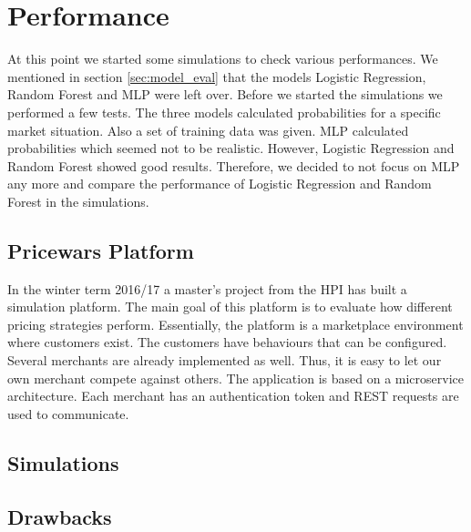 \section{Performance}
    At this point we started some simulations to check various performances. We mentioned in section \ref{sec:model_eval} that the models Logistic Regression, Random Forest and MLP were left over. Before we started the simulations we performed a few tests. The three models calculated probabilities for a specific market situation. Also a set of training data was given. MLP calculated probabilities which seemed not to be realistic. However, Logistic Regression and Random Forest showed good results. Therefore, we decided to not focus on MLP any more and compare the performance of Logistic Regression and Random Forest in the simulations.

\subsection{Pricewars Platform}
    In the winter term 2016/17 a master's project from the HPI has built a simulation platform. The main goal of this platform is to evaluate how different pricing strategies perform. Essentially, the platform is a marketplace environment where customers exist. The customers have behaviours that can be configured. Several merchants are already implemented as well. Thus, it is easy to let our own merchant compete against others. The application is based on a microservice architecture. Each merchant has an authentication token and REST requests are used to communicate.

\subsection{Simulations}
    
\subsection{Drawbacks}
